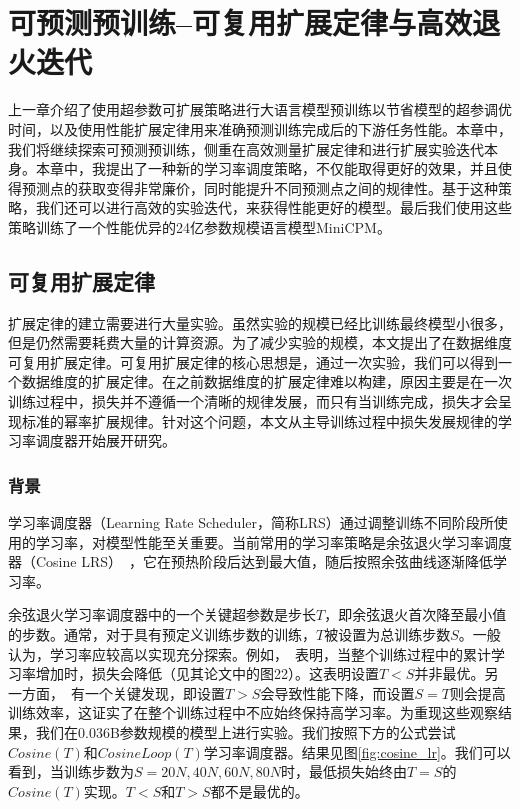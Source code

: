
\chapter{可预测预训练--可复用扩展定律与高效退火迭代}

上一章介绍了使用超参数可扩展策略进行大语言模型预训练以节省模型的超参调优时间，以及使用性能扩展定律用来准确预测训练完成后的下游任务性能。本章中，我们将继续探索可预测预训练，侧重在高效测量扩展定律和进行扩展实验迭代本身。本章中，我提出了一种新的学习率调度策略，不仅能取得更好的效果，并且使得预测点的获取变得非常廉价，同时能提升不同预测点之间的规律性。基于这种策略，我们还可以进行高效的实验迭代，来获得性能更好的模型。最后我们使用这些策略训练了一个性能优异的24亿参数规模语言模型MiniCPM。


\section{可复用扩展定律}
扩展定律的建立需要进行大量实验。虽然实验的规模已经比训练最终模型小很多，但是仍然需要耗费大量的计算资源。为了减少实验的规模，本文提出了在数据维度可复用扩展定律。可复用扩展定律的核心思想是，通过一次实验，我们可以得到一个数据维度的扩展定律。在之前数据维度的扩展定律难以构建，原因主要是在一次训练过程中，损失并不遵循一个清晰的规律发展，而只有当训练完成，损失才会呈现标准的幂率扩展规律。针对这个问题，本文从主导训练过程中损失发展规律的学习率调度器开始展开研究。

\subsection{背景}
学习率调度器（Learning Rate Scheduler，简称LRS）通过调整训练不同阶段所使用的学习率，对模型性能至关重要。当前常用的学习率策略是余弦退火学习率调度器（Cosine LRS）~\citep{kaplan2020scaling, hoffmann2022training, rae2021scaling, touvron2023llama, bai2023qwen, almazrouei2023falcon}，它在预热阶段后达到最大值，随后按照余弦曲线逐渐降低学习率。

余弦退火学习率调度器中的一个关键超参数是步长$T$，即余弦退火首次降至最小值的步数。通常，对于具有预定义训练步数的训练，$T$被设置为总训练步数$S$。一般认为，学习率应较高以实现充分探索。例如，~\citet{kaplan2020scaling}表明，当整个训练过程中的累计学习率增加时，损失会降低（见其论文中的图22）。这表明设置$T < S$并非最优。另一方面，~\citet{hoffmann2022training}有一个关键发现，即设置$T > S$会导致性能下降，而设置$S = T$则会提高训练效率，这证实了在整个训练过程中不应始终保持高学习率。为重现这些观察结果，我们在0.036B参数规模的模型上进行实验。我们按照下方的公式尝试$Cosine(T)$和$CosineLoop(T)$学习率调度器。结果见图\ref{fig:cosine_lr}。我们可以看到，当训练步数为$S = 20N, 40N, 60N, 80N$时，最低损失始终由$T = S$的$Cosine(T)$实现。$T < S$和$T > S$都不是最优的。

